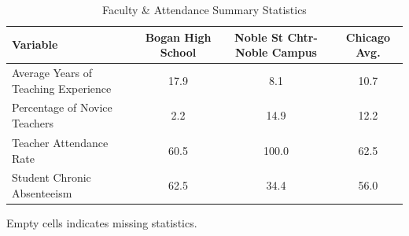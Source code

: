 \begin{table}[H]
\renewcommand{\arraystretch}{1.5}
\caption*{
{\large Faculty \& Attendance Summary Statistics}
} 

\fontsize{10pt}{11pt}\selectfont

\begin{tabular*}{\linewidth}{@{\extracolsep{\fill}}lccc}
\toprule
Variable & Bogan High School & Noble St Chtr-Noble Campus & Chicago Avg. \\ 
\midrule\addlinespace[2.5pt]
Average Years of Teaching Experience & 17.9 & 8.1 & 10.7 \\
Percentage of Novice Teachers & 2.2 & 14.9 & 12.2 \\
Teacher Attendance Rate & 60.5 & 100.0 & 62.5 \\
Student Chronic Absenteeism & 62.5 & 34.4 & 56.0 \\
\bottomrule
\end{tabular*}
\begin{minipage}{\linewidth}
Empty cells indicates missing statistics.\\
\end{minipage}
\end{table}
